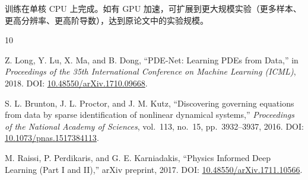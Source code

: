 \documentclass[11pt,a4paper]{article}
\begin{document}
训练在单核 CPU 上完成。如有 GPU 加速，可扩展到更大规模实验（更多样本、更高分辨率、更高阶导数），达到原论文中的实验规模。

\begin{thebibliography}{10}

Z. Long, Y. Lu, X. Ma, and B. Dong,
``PDE-Net: Learning PDEs from Data,''
in \textit{Proceedings of the 35th International Conference on Machine Learning (ICML)}, 2018.
DOI: \href{https://doi.org/10.48550/arXiv.1710.09668}{10.48550/arXiv.1710.09668}.

S. L. Brunton, J. L. Proctor, and J. M. Kutz,
``Discovering governing equations from data by sparse identification of nonlinear dynamical systems,''
\textit{Proceedings of the National Academy of Sciences}, vol.~113, no.~15, pp.~3932--3937, 2016.
DOI: \href{https://doi.org/10.1073/pnas.1517384113}{10.1073/pnas.1517384113}.

M. Raissi, P. Perdikaris, and G. E. Karniadakis,
``Physics Informed Deep Learning (Part I and II),''
arXiv preprint, 2017.
DOI: \href{https://doi.org/10.48550/arXiv.1711.10566}{10.48550/arXiv.1711.10566}.

\end{thebibliography}
\end{document}
